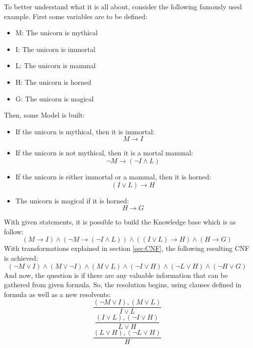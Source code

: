 \documentclass[12pt,english,pdflatex]{aghdpl}
\begin{document}
To better understand what it is all about, consider the following famously used example\cite{Uni}.  First some  variables are to be defined:
\begin{itemize}
\item M: The unicorn is mythical
\item I: The unicorn is immortal
\item L: The unicorn is mammal
\item H: The unicorn is horned
\item G: The unicorn is magical
\end{itemize}
Then, some Model is built:
\begin{itemize}
\item If the unicorn is mythical, then it is immortal:
\[
M \rightarrow I
\]
\item If the unicorn is not mythical, then it is a mortal mammal:
\[
\neg M \rightarrow (\neg I \wedge L)
\]
\item If the unicorn is either immortal or a mammal, then it is horned:
\[
(I \vee L) \rightarrow H
\]
\item The unicorn is magical if it is horned:
\[
H \rightarrow G
\]
\end{itemize}
With given statements, it is possible to build the Knowledge base which is as follow:
\begin{equation}
\label{equ:uni}
(M \rightarrow I) \wedge (\neg M \rightarrow (\neg I \wedge L)) \wedge ((I \vee L) \rightarrow H) \wedge (H \rightarrow G)
\end{equation}
With transformations explained in section \ref{sec:CNF}, the following resulting CNF  is achieved:
\begin{equation}
\label{equ:uniTransformed}
(\neg M \vee I) \wedge (M \vee \neg I) \wedge (M \vee L) \wedge (\neg I \vee H) \wedge (\neg L \vee H) \wedge (\neg H \vee G)
\end{equation}
And now, the question is if there are any valuable information that can be gathered from given formula. So, the resolution begins, using clauses defined in formula as well as a new resolvents: 
\begin{equation}
\label{equ:unif}
\frac{(\neg M \vee I), (M \vee L)}{I \vee L}
\end{equation}
\begin{equation}
\label{equ:unis}
\frac{(I \vee L), (\neg I \vee H)}{L \vee H}
\end{equation}
\begin{equation}
\label{equ:uniHorned}
\frac{(L \vee H), (\neg L \vee H)}{H}
\end{equation}
\end{document}
